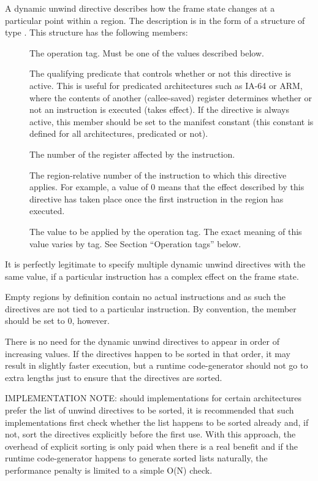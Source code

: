 \documentclass{article}
\begin{document}
A dynamic unwind directive describes how the frame state changes
at a particular point within a region.  The description is in
the form of a structure of type .  This
structure has the following members:
\begin{description}
\item[ ] The operation tag.  Must be one
  of the  values described below.
\item[ ] The qualifying predicate that controls
  whether or not this directive is active.  This is useful for
  predicated architectures such as IA-64 or ARM, where the contents of
  another (callee-saved) register determines whether or not an
  instruction is executed (takes effect).  If the directive is always
  active, this member should be set to the manifest constant
   (this constant is defined for all
  architectures, predicated or not).
\item[ ] The number of the register affected
  by the instruction.
\item[ ] The region-relative number of
  the instruction to which this directive applies.  For example,
  a value of 0 means that the effect described by this directive
  has taken place once the first instruction in the region has
  executed.
\item[ ] The value to be applied by the
  operation tag.  The exact meaning of this value varies by tag.  See
  Section ``Operation tags'' below.
\end{description}
It is perfectly legitimate to specify multiple dynamic unwind
directives with the same  value, if a particular instruction
has a complex effect on the frame state.

Empty regions by definition contain no actual instructions and as such
the directives are not tied to a particular instruction.  By
convention, the  member should be set to 0, however.

There is no need for the dynamic unwind directives to appear
in order of increasing  values.  If the directives happen to
be sorted in that order, it may result in slightly faster execution,
but a runtime code-generator should not go to extra lengths just to
ensure that the directives are sorted.

IMPLEMENTATION NOTE: should  implementations for
certain architectures prefer the list of unwind directives to be
sorted, it is recommended that such implementations first check
whether the list happens to be sorted already and, if not, sort the
directives explicitly before the first use.  With this approach, the
overhead of explicit sorting is only paid when there is a real benefit
and if the runtime code-generator happens to generate sorted lists
naturally, the performance penalty is limited to a simple O(N) check.
\end{document}
